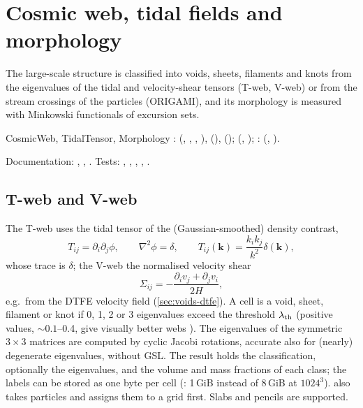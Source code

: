 \chapter{Cosmic web, tidal fields and morphology}\label{ch:cosmic-web}

The large-scale structure is classified into voids, sheets, filaments and knots from the eigenvalues of the tidal and
velocity-shear tensors (T-web, V-web) or from the stream crossings of the particles (ORIGAMI), and its morphology is measured
with Minkowski functionals of excursion sets.

\begin{modulebox}{CosmicWeb, TidalTensor, Morphology}
:  (, , , ),
 (),  (); 
(, ); : 
(, ).\par
Documentation: , , . Tests:
, , , ,
.
\end{modulebox}

\section{T-web and V-web}\label{sec:web-tweb}

The T-web \cite{Hahn2007,ForeroRomero2009} uses the tidal tensor of the (Gaussian-smoothed) density contrast,
\begin{equation}
T_{ij}=\partial_i\partial_j\phi,\qquad\nabla^2\phi=\delta,\qquad T_{ij}(\bm k)=\frac{k_ik_j}{k^2}\delta(\bm k),
\end{equation}
whose trace is $\delta$; the V-web \cite{Hoffman2012} the normalised velocity shear
\begin{equation}
\Sigma_{ij}=-\frac{\partial_iv_j+\partial_jv_i}{2H},
\end{equation}
e.g.\ from the DTFE velocity field (\cref{sec:voids-dtfe}). A cell is a void, sheet, filament or knot if 0, 1, 2 or 3 eigenvalues exceed the
threshold $\lambda_{\rm th}$ (positive values, $\sim0.1$--0.4, give visually better webs \cite{ForeroRomero2009,Hoffman2012}). The eigenvalues
of the symmetric $3\times3$ matrices are computed by cyclic Jacobi rotations, accurate also for (nearly) degenerate eigenvalues, without GSL.
The result holds the classification, optionally the eigenvalues, and the volume and mass fractions of each class; the labels can be stored as one
byte per cell (: 1\,GiB instead of 8\,GiB at $1024^3$).  also takes particles and assigns them to a
grid first. Slabs and pencils are supported.

